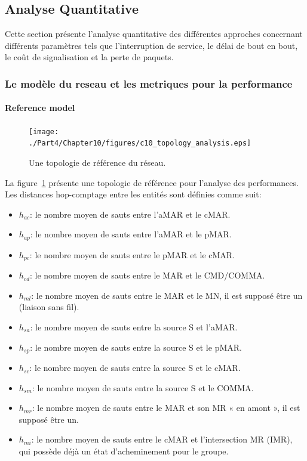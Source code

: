 \subsection{Analyse Quantitative} \label{c10:quantitative_analysis}
Cette section présente l'analyse quantitative des différentes approches concernant différents paramètres tels que l'interruption de service, le délai de bout en bout, le coût de signalisation et la perte de paquets.
 

\subsubsection{Le modèle du reseau et les metriques pour la performance}
\paragraph{Reference model}
\begin{figure}[tb!] 
  \begin{center} 
    \texttt{[image: ./Part4/Chapter10/figures/c10\_topology\_analysis.eps]} 
    \caption{Une topologie de référence du réseau.}
    \label{fig:c10_topology_analysis}
  \end{center} 
\end{figure}

La figure~\ref{fig:c10_topology_analysis} présente une topologie de référence pour l'analyse des performances. Les distances hop-comptage entre les entités sont définies comme suit:

\setlength \abovedisplayskip{-1pt}
\vspace{-0.1in}
\begin{itemize}
\itemsep 0.07em
\item $h_{ac}$: le nombre moyen de sauts entre l'aMAR et le cMAR.
\item $h_{ap}$: le nombre moyen de sauts entre l'aMAR et le pMAR.
\item $h_{pc}$: le nombre moyen de sauts entre le pMAR et le cMAR.
\item $h_{cd}$: le nombre moyen de sauts entre le MAR et le CMD/COMMA.
\item $h_{ml}$: le nombre moyen de sauts entre le MAR et le MN, il est supposé être un (liaison sans fil).
\item $h_{sa}$: le nombre moyen de sauts entre la source S et l'aMAR.
\item $h_{sp}$: le nombre moyen de sauts entre la source S et le pMAR.
\item $h_{sc}$: le nombre moyen de sauts entre la source S et le cMAR.
\item $h_{sm}$: le nombre moyen de sauts entre la source S et le COMMA.
\item $h_{mr}$: le nombre moyen de sauts entre le MAR et son MR « en amont », il est supposé être un. 
\item $h_{mi}$: le nombre moyen de sauts entre le cMAR et l'intersection MR (IMR), qui possède déjà un état ​​d'acheminement pour le groupe.
\end{itemize}

